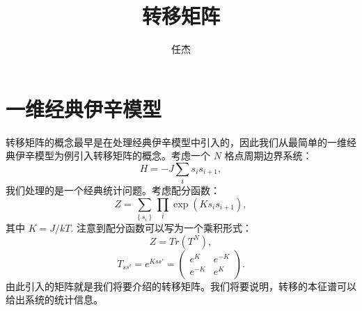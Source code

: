 \documentclass[UTF8]{ctexart}
\begin{document}
\title{转移矩阵}
\author{任杰}
\date{}

\maketitle

\section*{一维经典伊辛模型}
\noindent
转移矩阵的概念最早是在处理经典伊辛模型中引入的，因此我们从最简单的一维经典伊辛模型为例引入转移矩阵的概念。考虑一个 $N$ 格点周期边界系统：
\begin{equation}
H=-J\sum_{i}s_{i}s_{i+1},
\end{equation}
我们处理的是一个经典统计问题。考虑配分函数：
\begin{equation}
Z=\sum_{\left\{ s_{i}\right\} }\prod_{i}\exp\left(Ks_{i}s_{i+1}\right),
\end{equation}
其中 $K=J/kT$. 注意到配分函数可以写为一个乘积形式：
\begin{equation}
Z=Tr\left(T^{N}\right),
\end{equation}
\begin{equation}
T_{ss'}=e^{Kss'}=\left(\begin{array}{cc}
e^{K} & e^{-K}\\
e^{-K} & e^{K}
\end{array}\right).
\end{equation}
由此引入的矩阵就是我们将要介绍的转移矩阵。我们将要说明，转移的本征谱可以给出系统的统计信息。
\end{document}
